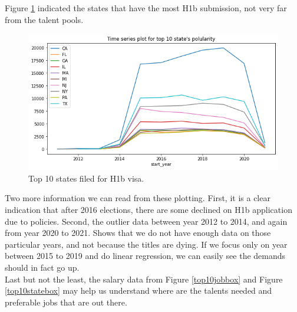 Figure \ref{top10state} indicated the states that have the most H1b submission, not very far from the talent pools. \\
\begin{figure}[h!]
	\begin{center}
		\includegraphics[width=\linewidth]{./photos/top10state_timeseries.png}
	\end{center}
	\caption{Top 10 states filed for H1b visa.}
	\label{top10state}
\end{figure}
Two more information we can read from these plotting. First, it is a clear indication that after 2016 elections, there are some declined on H1b application due to policies. Second, the outlier data between year 2012 to  2014, and again from year 2020 to 2021. Shows that we do not have enough data on those particular years, and not because the titles are dying. If we focus only on year between 2015 to 2019 and do linear regression, we can easily see the demands should in fact go up. \\
Last but not the least, the salary data from Figure \ref{top10jobbox} and Figure \ref{top10statebox} may help us understand where are the talents needed and preferable jobs that are out there. 
